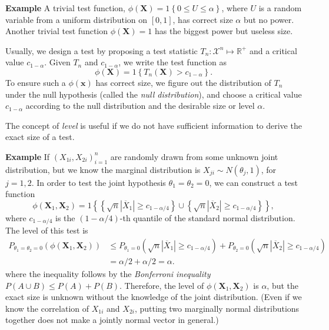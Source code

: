 \documentclass[11pt]{article}
\begin{document}
\bigskip 

\textbf{Example} A trivial test function,
\(\phi(\mathbf{X})=1\left\{ 0\leq U\leq\alpha\right\}\), where \(U\) is
a random variable from a uniform distribution on \(\left[0,1\right]\),
has correct size $\alpha$ but no power. Another trivial test function
\(\phi\left(\mathbf{X}\right)=1\) has the biggest power but useless
size.

\bigskip 

    Usually, we design a test by proposing a test statistic
\(T_{n}:\mathcal{X}^{n}\mapsto\mathbb{R}^{+}\) and a critical value
\(c_{1-\alpha}\). Given \(T_n\) and \(c_{1-\alpha}\), we write the test
function as
\[\phi\left(\mathbf{X}\right)=1\left\{ T_{n}\left(\mathbf{X}\right)>c_{1-\alpha}\right\}.\]
To ensure such a \(\phi\left(\mathbf{x}\right)\) has correct size, we
figure out the distribution of \(T_{n}\) under the null hypothesis
(called the \emph{null distribution}), and choose a critical value
\(c_{1-\alpha}\) according to the null distribution and the desirable
size or level \(\alpha\).

The concept of \emph{level} is useful if we do not have sufficient information to
derive the exact size of a test.

\bigskip

\textbf{Example} If \(\left(X_{1i},X_{2i}\right)_{i=1}^{n}\) are
randomly drawn from some unknown joint distribution, but we know the
marginal distribution is \(X_{ji}\sim N\left(\theta_{j},1\right)\), for
\(j=1,2\). In order to test the joint hypothesis
\(\theta_{1}=\theta_{2}=0\), we can construct a test function
\[\phi\left(\mathbf{X}_{1},\mathbf{X}_{2}\right)=1\left\{ \left\{ \sqrt{n}\left|\overline{X}_{1}\right|\geq c_{1-\alpha/4}\right\} \cup\left\{ \sqrt{n}\left|\overline{X}_{2}\right|\geq c_{1-\alpha/4}\right\} \right\} ,\]
where \(c_{1-\alpha/4}\) is the \(\left(1-\alpha/4\right)\)-th quantile
of the standard normal distribution. The level of this test is
\[\begin{aligned}
P_{\theta_{1}=\theta_{2}=0}\left(\phi\left(\mathbf{X}_{1},\mathbf{X}_{2}\right)\right) & \leq P_{\theta_{1}=0}\left(\sqrt{n}\left|\overline{X}_{1}\right|\geq c_{1-\alpha/4}\right)+P_{\theta_{2}=0}\left(\sqrt{n}\left|\overline{X}_{2}\right|\geq c_{1-\alpha/4}\right)\\
 & =\alpha/2+\alpha/2=\alpha.\end{aligned}\] where the inequality
follows by the \emph{Bonferroni inequality}
\(P\left(A\cup B\right)\leq P\left(A\right)+P\left(B\right)\).
Therefore, the level of
\(\phi\left(\mathbf{X}_{1},\mathbf{X}_{2}\right)\) is \(\alpha\), but
the exact size is unknown without the knowledge of the joint
distribution. (Even if we know the correlation of \(X_{1i}\) and
\(X_{2i}\), putting two marginally normal distributions together does
not make a jointly normal vector in general.)
\end{document}
